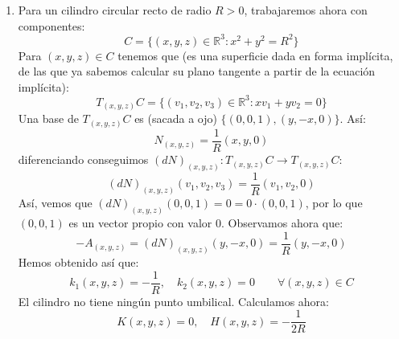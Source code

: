 \begin{ejemplo}
\begin{enumerate}
        \item Para un cilindro circular recto de radio $R>0$, trabajaremos ahora con componentes:
            \begin{equation*}
                C = \{(x,y,z)\in \mathbb{R}^3 : x^2+y^2 = R^2\}
            \end{equation*}
            Para $(x,y,z)\in C$ tenemos que (es una superficie dada en forma implícita, de las que ya sabemos calcular su plano tangente a partir de la ecuación implícita):
            \begin{equation*}
                T_{(x,y,z)}C = \{(v_1,v_2,v_3)\in \mathbb{R}^3 : xv_1 + yv_2 = 0\}
            \end{equation*}
            Una base de $T_{(x,y,z)}C$ es (sacada a ojo) $\{(0,0,1), (y,-x,0)\}$. Así:
            \begin{equation*}
                N_{(x,y,z)} = \frac{1}{R}(x,y,0)
            \end{equation*}
            diferenciando conseguimos $(dN)_{(x,y,z)}:T_{(x,y,z)}C\to T_{(x,y,z)}C$:
            \begin{equation*}
                (dN)_{(x,y,z)}(v_1,v_2,v_3) = \frac{1}{R}(v_1,v_2,0)
            \end{equation*}
            Así, vemos que $(dN)_{(x,y,z)}(0,0,1) = 0 = 0\cdot (0,0,1)$, por lo que $(0,0,1)$ es un vector propio con valor $0$. Observamos ahora que:
            \begin{equation*}
                -A_{(x,y,z)} = (dN)_{(x,y,z)}(y,-x,0) = \frac{1}{R}(y,-x,0)
            \end{equation*}
            Hemos obtenido así que:
            \begin{equation*}
                k_1(x,y,z) = -\frac{1}{R}, \quad k_2(x,y,z) = 0\qquad \forall (x,y,z)\in C
            \end{equation*}
            El cilindro no tiene ningún punto umbilical. Calculamos ahora:
            \begin{equation*}
                K(x,y,z) = 0,\quad H(x,y,z) = -\frac{1}{2R}
            \end{equation*}
    \end{enumerate}
\end{ejemplo}

